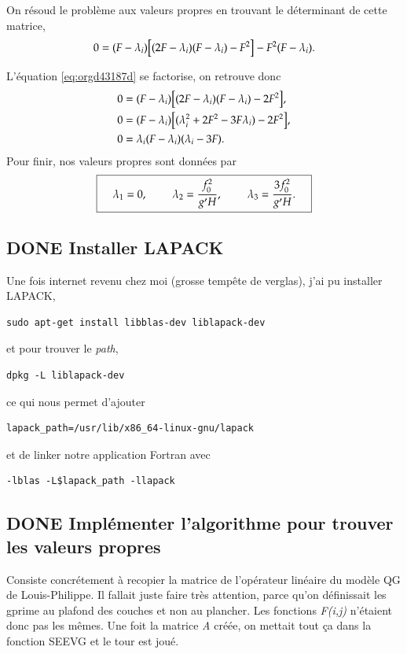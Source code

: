 \documentclass[10pt]{article}
\numberwithin{equation}{section}
\begin{document}
On résoud le problème aux valeurs propres en trouvant le déterminant de cette matrice,
\begin{equation}
\label{eq:orgd43187d}
0 = (F-\lambda_i)\qty[(2F - \lambda_i)(F-\lambda_i) - F^2] - F^2(F-\lambda_i).
\end{equation}

L'équation \ref{eq:orgd43187d} se factorise, on retrouve donc
\begin{align}
&0 = (F-\lambda_i)\qty[(2F - \lambda_i)(F-\lambda_i) - 2F^2],\nonumber\\
&0 = (F-\lambda_i)\qty[(\lambda^2_i + 2F^2 - 3 F \lambda_i) - 2F^2],\nonumber\\
&0 = \lambda_i \qty(F-\lambda_i)\qty(\lambda_i - 3F).
\end{align}
Pour finir, nos valeurs propres sont données par
\begin{align}
\boxed{\hspace{0.4cm} \lambda_1 = 0,
\hspace{0.8cm} \lambda_2 = \frac{f_0^2}{g' H}, 
\hspace{0.8cm} \lambda_3 = \frac{3 f_0^2}{g'H}. \hspace{0.4cm}}   
\end{align}

\subsection{{\bfseries\sffamily DONE} Installer LAPACK}
\label{sec:org6bd9789}
Une fois internet revenu chez moi (grosse tempête de verglas), j'ai pu installer LAPACK,
\begin{verbatim}
sudo apt-get install libblas-dev liblapack-dev
\end{verbatim}
et pour trouver le \emph{path},
\begin{verbatim}
dpkg -L liblapack-dev
\end{verbatim}
ce qui nous permet d'ajouter
\begin{verbatim}
lapack_path=/usr/lib/x86_64-linux-gnu/lapack
\end{verbatim}
et de linker notre application Fortran avec
\begin{verbatim}
-lblas -L$lapack_path -llapack
\end{verbatim}

\subsection{{\bfseries\sffamily DONE} Implémenter l'algorithme pour trouver les valeurs propres}
\label{sec:org85922cc}
Consiste concrétement à recopier la matrice de l'opérateur linéaire du modèle QG de Louis-Philippe.
Il fallait juste faire très attention, parce qu'on définissait les gprime au plafond des couches et non au plancher.
Les fonctions \emph{F(i,j)} n'étaient donc pas les mêmes.
Une foit la matrice \emph{A} créée, on mettait tout ça dans la fonction SEEVG et le tour est joué.
\end{document}
